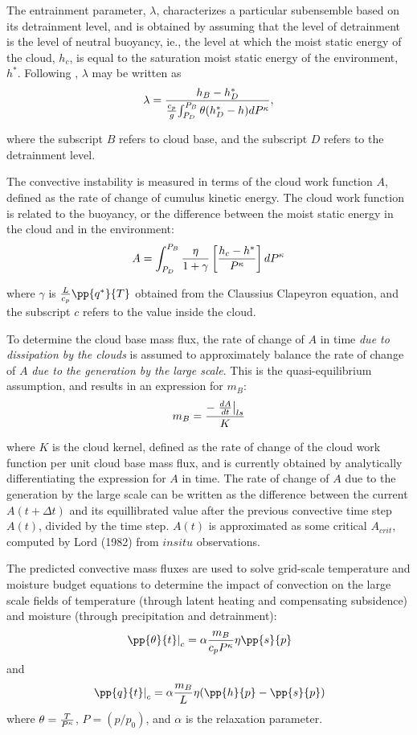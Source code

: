 The entrainment parameter, $\lambda$, characterizes a particular subensemble based on its
detrainment level, and is obtained by assuming that the level of detrainment is the level of neutral
buoyancy, ie., the level at which the moist static energy of the cloud, $h_c$, is equal 
to the saturation moist static energy of the environment, $h^*$.  Following \cite{moorsz:92},
$\lambda$ may be written as
\[
\lambda = { {h_B - h^*_D} \over { {c_p \over g} {\int_{P_D}^{P_B}\theta(h^*_D-h)dP^{\kappa}}} } ,
\]

where the subscript $B$ refers to cloud base, and the subscript $D$ refers to the detrainment level.


The convective instability is measured in terms of the cloud work function $A$, defined as the
rate of change of cumulus kinetic energy. The cloud work function is 
related to the buoyancy, or the difference
between the moist static energy in the cloud and in the environment:
\[
A = \int_{P_D}^{P_B} { {\eta \over {1 + \gamma} } 
\left[ {{h_c-h^*} \over {P^{\kappa}}} \right] dP^{\kappa}}
\]

where $\gamma$ is ${L \over {c_p}}\pp{q^*}{T}$ obtained from the Claussius Clapeyron equation,
and the subscript $c$ refers to the value inside the cloud.


To determine the cloud base mass flux, the rate of change of $A$ in time {\em due to dissipation by 
the clouds} is assumed to approximately balance the rate of change of $A$ {\em due to the generation 
by the large scale}. This is the quasi-equilibrium assumption, and results in an expression for $m_B$:
\[
m_B = {{- \left.{dA \over dt} \right|_{ls}} \over K}
\]

where $K$ is the cloud kernel, defined as the rate of change of the cloud work function per
unit cloud base mass flux, and is currently obtained by analytically differentiating the 
expression for $A$ in time.
The rate of change of $A$ due to the generation by the large scale can be written as the
difference between the current $A(t+\Delta t)$ and its equillibrated value after the previous 
convective time step 
$A(t)$, divided by the time step. $A(t)$ is approximated as some critical $A_{crit}$,
computed by Lord (1982) from $in situ$ observations.


The predicted convective mass fluxes are used to solve grid-scale temperature
and moisture budget equations to determine the impact of convection on the large scale fields of
temperature (through latent heating and compensating subsidence) and moisture (through
precipitation and detrainment):
\[
\left.{\pp{\theta}{t}}\right|_{c} = \alpha { m_B \over {c_p P^{\kappa}}} \eta \pp{s}{p}
\]
and
\[
\left.{\pp{q}{t}}\right|_{c} = \alpha { m_B \over {L}} \eta (\pp{h}{p}-\pp{s}{p})
\]
where $\theta = {T \over P^{\kappa}}$, $P = (p/p_0)$, and $\alpha$ is the relaxation parameter.

